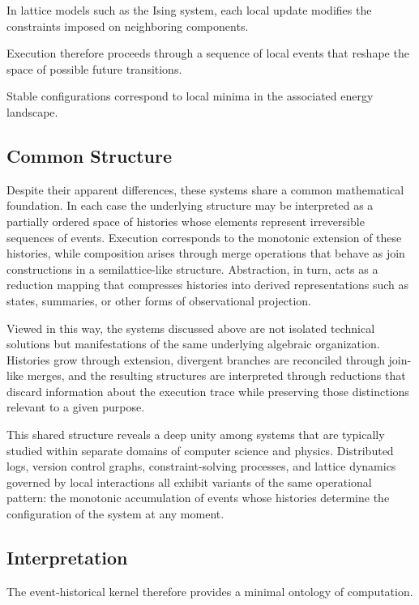 \documentclass[12pt]{article}
\begin{document}
In lattice models such as the Ising system,
each local update modifies the constraints
imposed on neighboring components.

Execution therefore proceeds through a sequence
of local events that reshape the space of
possible future transitions.

Stable configurations correspond to local minima
in the associated energy landscape.

\subsection{Common Structure}

Despite their apparent differences, these systems share
a common mathematical foundation. In each case the
underlying structure may be interpreted as a partially
ordered space of histories whose elements represent
irreversible sequences of events. Execution corresponds
to the monotonic extension of these histories, while
composition arises through merge operations that behave
as join constructions in a semilattice-like structure.
Abstraction, in turn, acts as a reduction mapping that
compresses histories into derived representations such
as states, summaries, or other forms of observational
projection.

Viewed in this way, the systems discussed above are not
isolated technical solutions but manifestations of the
same underlying algebraic organization. Histories grow
through extension, divergent branches are reconciled
through join-like merges, and the resulting structures
are interpreted through reductions that discard
information about the execution trace while preserving
those distinctions relevant to a given purpose.

This shared structure reveals a deep unity among systems
that are typically studied within separate domains of
computer science and physics. Distributed logs, version
control graphs, constraint-solving processes, and lattice
dynamics governed by local interactions all exhibit
variants of the same operational pattern: the monotonic
accumulation of events whose histories determine the
configuration of the system at any moment.

\subsection{Interpretation}

The event-historical kernel therefore provides
a minimal ontology of computation.
\end{document}
